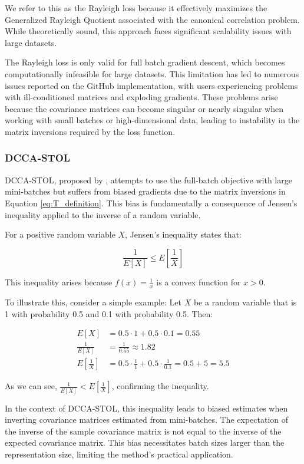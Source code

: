 We refer to this as the Rayleigh loss because it effectively maximizes the Generalized Rayleigh Quotient associated with the canonical correlation problem. While theoretically sound, this approach faces significant scalability issues with large datasets.

The Rayleigh loss is only valid for full batch gradient descent, which becomes computationally infeasible for large datasets. This limitation has led to numerous issues reported on the GitHub implementation, with users experiencing problems with ill-conditioned matrices and exploding gradients. These problems arise because the covariance matrices can become singular or nearly singular when working with small batches or high-dimensional data, leading to instability in the matrix inversions required by the loss function.

\subsubsection{DCCA-STOL}
DCCA-STOL, proposed by \citet{wang2015unsupervised}, attempts to use the full-batch objective with large mini-batches but suffers from biased gradients due to the matrix inversions in Equation \eqref{eq:T_definition}. This bias is fundamentally a consequence of Jensen's inequality applied to the inverse of a random variable. 

For a positive random variable $X$, Jensen's inequality states that:

\begin{equation}
\frac{1}{E[X]} \leq E[\frac{1}{X}]
\end{equation}

This inequality arises because $f(x) = \frac{1}{x}$ is a convex function for $x > 0$. 

To illustrate this, consider a simple example: Let $X$ be a random variable that is 1 with probability 0.5 and 0.1 with probability 0.5. Then:

\begin{align}
    E[X] &= 0.5 \cdot 1 + 0.5 \cdot 0.1 = 0.55 \\
    \frac{1}{E[X]} &= \frac{1}{0.55} \approx 1.82 \\
    E[\frac{1}{X}] &= 0.5 \cdot \frac{1}{1} + 0.5 \cdot \frac{1}{0.1} = 0.5 + 5 = 5.5
\end{align}

As we can see, $\frac{1}{E[X]} < E[\frac{1}{X}]$, confirming the inequality. 

In the context of DCCA-STOL, this inequality leads to biased estimates when inverting covariance matrices estimated from mini-batches. The expectation of the inverse of the sample covariance matrix is not equal to the inverse of the expected covariance matrix. This bias necessitates batch sizes larger than the representation size, limiting the method's practical application.

